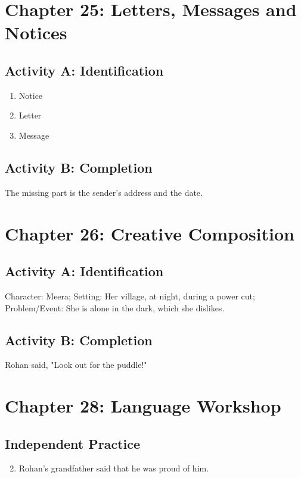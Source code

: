 \section*{Chapter 25: Letters, Messages and Notices}
\subsection*{Activity A: Identification}
\begin{enumerate}
    \item Notice
    \item Letter
    \item Message
\end{enumerate}
\subsection*{Activity B: Completion}
The missing part is the sender's address and the date.

\section*{Chapter 26: Creative Composition}
\subsection*{Activity A: Identification}
Character: Meera; Setting: Her village, at night, during a power cut; Problem/Event: She is alone in the dark, which she dislikes.
\subsection*{Activity B: Completion}
Rohan said, "Look out for the puddle!"

\section*{Chapter 28: Language Workshop}
\subsection*{Independent Practice}
\begin{enumerate}
    \setcounter{enumi}{1}
    \item Rohan's grandfather said that he was proud of him.
\end{enumerate}